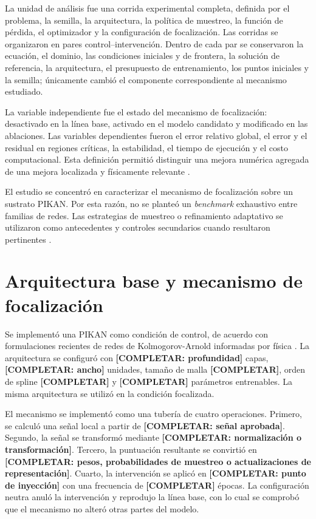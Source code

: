 La unidad de análisis fue una corrida experimental completa, definida por el problema, la semilla, la arquitectura, la política de muestreo, la función de pérdida, el optimizador y la configuración de focalización. Las corridas se organizaron en pares control–intervención. Dentro de cada par se conservaron la ecuación, el dominio, las condiciones iniciales y de frontera, la solución de referencia, la arquitectura, el presupuesto de entrenamiento, los puntos iniciales y la semilla; únicamente cambió el componente correspondiente al mecanismo estudiado.

La variable independiente fue el estado del mecanismo de focalización: desactivado en la línea base, activado en el modelo candidato y modificado en las ablaciones. Las variables dependientes fueron el error relativo global, el error y el residual en regiones críticas, la estabilidad, el tiempo de ejecución y el costo computacional. Esta definición permitió distinguir una mejora numérica agregada de una mejora localizada y físicamente relevante \cite{grossmann2024,krishnapriyan2021,shukla2024fair}.

El estudio se concentró en caracterizar el mecanismo de focalización sobre un sustrato PIKAN. Por esta razón, no se planteó un \textit{benchmark} exhaustivo entre familias de redes. Las estrategias de muestreo o refinamiento adaptativo se utilizaron como antecedentes y controles secundarios cuando resultaron pertinentes \cite{lu2021deepxde,wu2023sampling,kharazmi2021hpvpinns}.

\section{Arquitectura base y mecanismo de focalización}
\label{subsec:arquitectura-base-mecanismo}

Se implementó una PIKAN como condición de control, de acuerdo con formulaciones recientes de redes de Kolmogorov-Arnold informadas por física \cite{toscano2025pikans,shukla2024fair,wang2025kinn}. La arquitectura se configuró con \textbf{[COMPLETAR: profundidad]} capas, \textbf{[COMPLETAR: ancho]} unidades, tamaño de malla \textbf{[COMPLETAR]}, orden de spline \textbf{[COMPLETAR]} y \textbf{[COMPLETAR]} parámetros entrenables. La misma arquitectura se utilizó en la condición focalizada.

El mecanismo se implementó como una tubería de cuatro operaciones. Primero, se calculó una señal local a partir de \textbf{[COMPLETAR: señal aprobada]}. Segundo, la señal se transformó mediante \textbf{[COMPLETAR: normalización o transformación]}. Tercero, la puntuación resultante se convirtió en \textbf{[COMPLETAR: pesos, probabilidades de muestreo o actualizaciones de representación]}. Cuarto, la intervención se aplicó en \textbf{[COMPLETAR: punto de inyección]} con una frecuencia de \textbf{[COMPLETAR]} épocas. La configuración neutra anuló la intervención y reprodujo la línea base, con lo cual se comprobó que el mecanismo no alteró otras partes del modelo.

